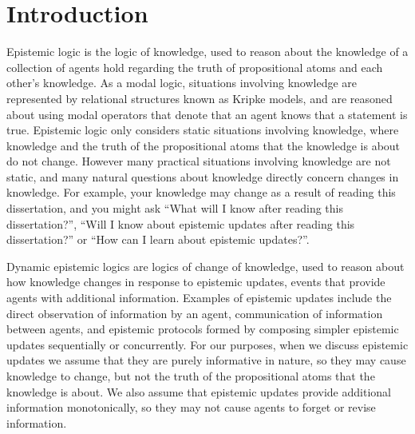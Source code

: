 \chapter{Introduction}\label{introduction}

Epistemic logic is the logic of knowledge, used to reason about the knowledge of a collection of agents hold regarding the truth of propositional atoms and each other's knowledge.
As a modal logic, situations involving knowledge are represented by relational structures known as Kripke models, and are reasoned about using modal operators that denote that an agent knows that a statement is true.
Epistemic logic only considers static situations involving knowledge, where knowledge and the truth of the propositional atoms that the knowledge is about do not change.
However many practical situations involving knowledge are not static, and many natural questions about knowledge directly concern changes in knowledge.
For example, your knowledge may change as a result of reading this dissertation, and you might ask ``What will I know after reading this dissertation?'', ``Will I know about epistemic updates after reading this dissertation?'' or ``How can I learn about epistemic updates?''.

Dynamic epistemic logics are logics of change of knowledge, used to reason about how knowledge changes in response to epistemic updates, events that provide agents with additional information.
Examples of epistemic updates include the direct observation of information by an agent, communication of information between agents, and epistemic protocols formed by composing simpler epistemic updates sequentially or concurrently.
For our purposes, when we discuss epistemic updates we assume that they are purely informative in nature, so they may cause knowledge to change, but not the truth of the propositional atoms that the knowledge is about.
We also assume that epistemic updates provide additional information monotonically, so they may not cause agents to forget or revise information.

